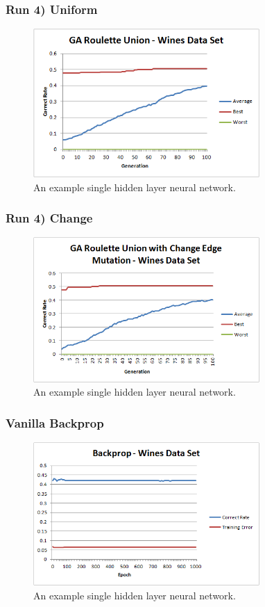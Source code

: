 \documentclass[journal]{IEEEtran}
\begin{document}
    \subsubsection*{Run 4) Uniform}
      \begin{figure}[here]%
        \centering
        \includegraphics[width=3.4in]{wine_uniform}
        \caption{An example single hidden layer neural network.}
        \label{fig:wine_uniform}
      \end{figure}
      
    \subsubsection*{Run 4) Change}
      \begin{figure}[here]%
        \centering
        \includegraphics[width=3.4in]{wine_change_edge}
        \caption{An example single hidden layer neural network.}
        \label{fig:wine_change_edge}
      \end{figure}
    
    \subsubsection{Vanilla Backprop}
      \begin{figure}[here]%
        \centering
        \includegraphics[width=3.4in]{brain_wine}
        \caption{An example single hidden layer neural network.}
        \label{fig:brain_wine}
      \end{figure}
    
\end{document}
